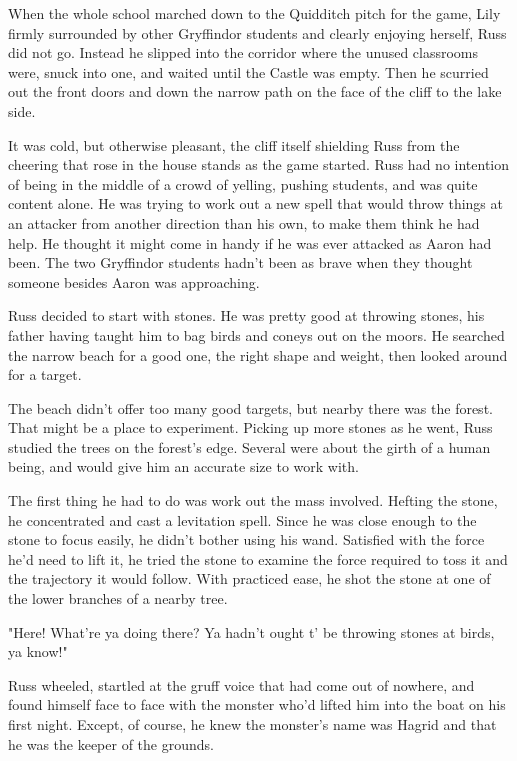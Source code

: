 \documentclass[a4paper,11pt]{article}
\begin{document}
When the whole school marched down to the Quidditch pitch for the game, Lily firmly surrounded by other Gryffindor students and clearly enjoying herself, Russ did not go. Instead he slipped into the corridor where the unused classrooms were, snuck into one, and waited until the Castle was empty. Then he scurried out the front doors and down the narrow path on the face of the cliff to the lake side.

It was cold, but otherwise pleasant, the cliff itself shielding Russ from the cheering that rose in the house stands as the game started. Russ had no intention of being in the middle of a crowd of yelling, pushing students, and was quite content alone. He was trying to work out a new spell that would throw things at an attacker from another direction than his own, to make them think he had help. He thought it might come in handy if he was ever attacked as Aaron had been. The two Gryffindor students hadn't been as brave when they thought someone besides Aaron was approaching.

Russ decided to start with stones. He was pretty good at throwing stones, his father having taught him to bag birds and coneys out on the moors. He searched the narrow beach for a good one, the right shape and weight, then looked around for a target.

The beach didn't offer too many good targets, but nearby there was the forest. That might be a place to experiment. Picking up more stones as he went, Russ studied the trees on the forest's edge. Several were about the girth of a human being, and would give him an accurate size to work with.

The first thing he had to do was work out the mass involved. Hefting the stone, he concentrated and cast a levitation spell. Since he was close enough to the stone to focus easily, he didn't bother using his wand. Satisfied with the force he'd need to lift it, he tried the stone to examine the force required to toss it and the trajectory it would follow. With practiced ease, he shot the stone at one of the lower branches of a nearby tree.

"Here! What're ya doing there? Ya hadn't ought t' be throwing stones at birds, ya know!"

Russ wheeled, startled at the gruff voice that had come out of nowhere, and found himself face to face with the monster who'd lifted him into the boat on his first night. Except, of course, he knew the monster's name was Hagrid and that he was the keeper of the grounds.
\end{document}
